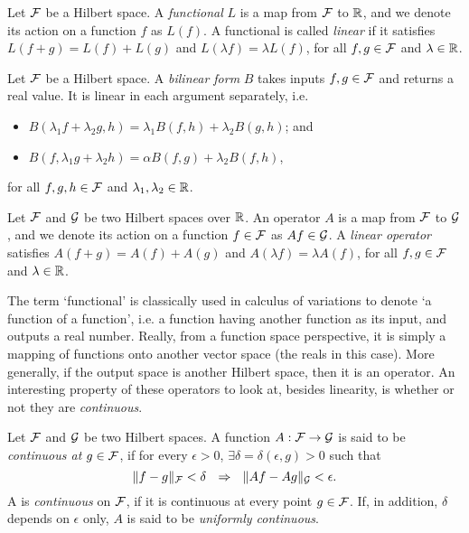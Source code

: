 \begin{definition}
  Let ${\mathcal F}$ be a Hilbert space.
  A \emph{functional} $L$ is a map from ${\mathcal F}$ to $\mathbb{R}$, and we denote its action on a function $f$ as $L(f)$. 
  A functional is called \emph{linear} if it satisfies $L(f+g)=L(f)+L(g)$ and $L(\lambda f)=\lambda L(f)$, for all $f,g\in{\mathcal F}$ and $\lambda\in\mathbb{R}$.
\end{definition}

\begin{definition}
  Let ${\mathcal F}$ be a Hilbert space.
  A \emph{bilinear form} $B$ takes inputs $f,g\in{\mathcal F}$ and returns a real value.
  It is linear in each argument separately, i.e.
  \begin{itemize}
    \item $B(\lambda_1 f +\lambda_2 g, h) = \lambda_1 B(f,h) + \lambda_2 B(g,h)$; and
    \item $B(f, \lambda_1 g +\lambda_2 h) = \alpha B(f,g) + \lambda_2 B(f,h)$,
  \end{itemize} 
  for all $f,g,h \in {\mathcal F}$ and $\lambda_1,\lambda_2\in\mathbb{R}$.
\end{definition}

\begin{definition}
  Let ${\mathcal F}$ and ${\mathcal G}$ be two Hilbert spaces over $\mathbb{R}$.
  An operator $A$ is a map from ${\mathcal F}$ to ${\mathcal G}$, and we denote its action on a function $f \in{\mathcal F}$ as $Af \in {\mathcal G}$.
  A \emph{linear operator} satisfies $A(f+g) = A(f) + A(g)$ and $A(\lambda f) = \lambda A(f)$, for all $f,g \in{\mathcal F}$ and $\lambda\in\mathbb{R}$.
\end{definition}

The term `functional' is classically used in calculus of variations to denote `a function of a function', i.e. a function having another function as its input, and outputs a real number.
Really, from a function space perspective, it is simply a mapping of functions onto another vector space (the reals in this case).
More generally, if the output space is another Hilbert space, then it is an operator.
An interesting property of these operators to look at, besides linearity, is whether or not they are \emph{continuous}.

\begin{definition}[Continuity]\label{def:continuity}
  Let ${\mathcal F}$ and ${\mathcal G}$ be two Hilbert spaces.
  A function $A:{\mathcal F}\to{\mathcal G}$ is said to be \emph{continuous at $g\in{\mathcal F}$}, if for every $\epsilon>0$, $\exists \delta=\delta(\epsilon,g)>0$ such that
  \[
    \norm{f-g}_\cF < \delta \ \ \Rightarrow \ \ \norm{Af - Ag}_\cG < \epsilon.
  \]
  A is \emph{continuous} on ${\mathcal F}$, if it is continuous at every point $g \in{\mathcal F}$.
  If, in addition, $\delta$ depends on $\epsilon$ only, $A$ is said to be \emph{uniformly continuous}.
\end{definition}


